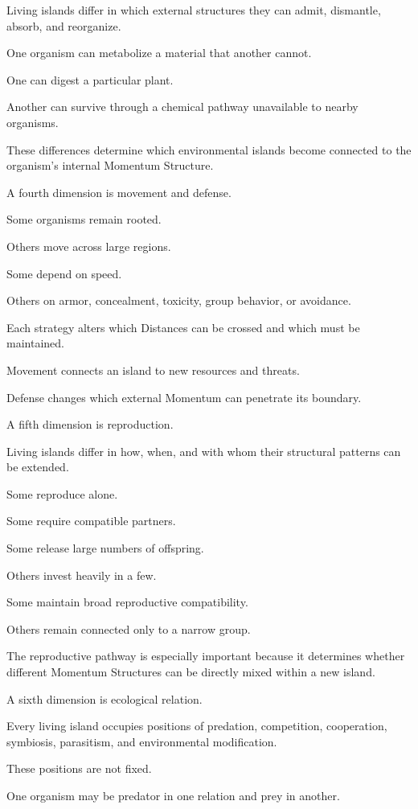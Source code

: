 Living islands differ in which external structures they can admit, dismantle, absorb, and reorganize.

One organism can metabolize a material that another cannot.

One can digest a particular plant.

Another can survive through a chemical pathway unavailable to nearby organisms.

These differences determine which environmental islands become connected to the organism’s internal Momentum Structure.

A fourth dimension is movement and defense.

Some organisms remain rooted.

Others move across large regions.

Some depend on speed.

Others on armor, concealment, toxicity, group behavior, or avoidance.

Each strategy alters which Distances can be crossed and which must be maintained.

Movement connects an island to new resources and threats.

Defense changes which external Momentum can penetrate its boundary.

A fifth dimension is reproduction.

Living islands differ in how, when, and with whom their structural patterns can be extended.

Some reproduce alone.

Some require compatible partners.

Some release large numbers of offspring.

Others invest heavily in a few.

Some maintain broad reproductive compatibility.

Others remain connected only to a narrow group.

The reproductive pathway is especially important because it determines whether different Momentum Structures can be directly mixed within a new island.

A sixth dimension is ecological relation.

Every living island occupies positions of predation, competition, cooperation, symbiosis, parasitism, and environmental modification.

These positions are not fixed.

One organism may be predator in one relation and prey in another.

